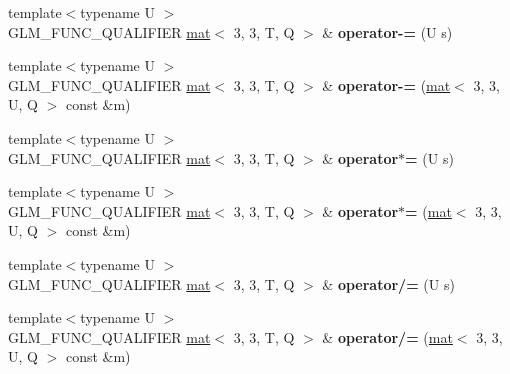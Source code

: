 \begin{DoxyCompactItemize}
\item 
\mbox{\label{structglm_1_1mat_3_013_00_013_00_01T_00_01Q_01_4_acd25696de3d8abb588896e405fa0e314}} 
{\footnotesize template$<$typename U $>$ }\\G\+L\+M\+\_\+\+F\+U\+N\+C\+\_\+\+Q\+U\+A\+L\+I\+F\+I\+ER \hyperlink{structglm_1_1mat}{mat}$<$ 3, 3, T, Q $>$ \& {\bfseries operator-\/=} (U s)
\item 
\mbox{\label{structglm_1_1mat_3_013_00_013_00_01T_00_01Q_01_4_ab89e6f23520371a3c2294d906ec59d07}} 
{\footnotesize template$<$typename U $>$ }\\G\+L\+M\+\_\+\+F\+U\+N\+C\+\_\+\+Q\+U\+A\+L\+I\+F\+I\+ER \hyperlink{structglm_1_1mat}{mat}$<$ 3, 3, T, Q $>$ \& {\bfseries operator-\/=} (\hyperlink{structglm_1_1mat}{mat}$<$ 3, 3, U, Q $>$ const \&m)
\item 
\mbox{\label{structglm_1_1mat_3_013_00_013_00_01T_00_01Q_01_4_a17980b36cc9b56a4826a855a21ca4229}} 
{\footnotesize template$<$typename U $>$ }\\G\+L\+M\+\_\+\+F\+U\+N\+C\+\_\+\+Q\+U\+A\+L\+I\+F\+I\+ER \hyperlink{structglm_1_1mat}{mat}$<$ 3, 3, T, Q $>$ \& {\bfseries operator$\ast$=} (U s)
\item 
\mbox{\label{structglm_1_1mat_3_013_00_013_00_01T_00_01Q_01_4_a7c00c95a88f92ef9bf08db8a921c6e83}} 
{\footnotesize template$<$typename U $>$ }\\G\+L\+M\+\_\+\+F\+U\+N\+C\+\_\+\+Q\+U\+A\+L\+I\+F\+I\+ER \hyperlink{structglm_1_1mat}{mat}$<$ 3, 3, T, Q $>$ \& {\bfseries operator$\ast$=} (\hyperlink{structglm_1_1mat}{mat}$<$ 3, 3, U, Q $>$ const \&m)
\item 
\mbox{\label{structglm_1_1mat_3_013_00_013_00_01T_00_01Q_01_4_a01c97ce833185af46bbdb1ab5f4cb9a9}} 
{\footnotesize template$<$typename U $>$ }\\G\+L\+M\+\_\+\+F\+U\+N\+C\+\_\+\+Q\+U\+A\+L\+I\+F\+I\+ER \hyperlink{structglm_1_1mat}{mat}$<$ 3, 3, T, Q $>$ \& {\bfseries operator/=} (U s)
\item 
\mbox{\label{structglm_1_1mat_3_013_00_013_00_01T_00_01Q_01_4_a9fea79c2d1b00d77863a64dad3ddb1af}} 
{\footnotesize template$<$typename U $>$ }\\G\+L\+M\+\_\+\+F\+U\+N\+C\+\_\+\+Q\+U\+A\+L\+I\+F\+I\+ER \hyperlink{structglm_1_1mat}{mat}$<$ 3, 3, T, Q $>$ \& {\bfseries operator/=} (\hyperlink{structglm_1_1mat}{mat}$<$ 3, 3, U, Q $>$ const \&m)
\end{DoxyCompactItemize}
